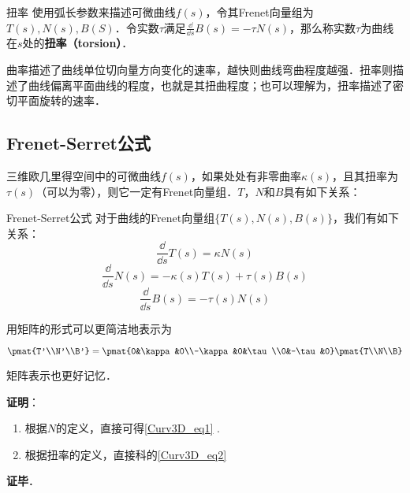 \begin{definition}{扭率}
使用弧长参数来描述可微曲线$f(s)$，令其Frenet向量组为$T(s), N(s), B(S)$．令实数$\tau$满足$\frac{\dd}{\dd s}B(s)=-\tau N(s)$，那么称实数$\tau$为曲线在$s$处的\textbf{扭率（torsion）}．
\end{definition}

曲率描述了曲线单位切向量方向变化的速率，越快则曲线弯曲程度越强．扭率则描述了曲线偏离平面曲线的程度，也就是其扭曲程度；也可以理解为，扭率描述了密切平面旋转的速率．

\subsection{Frenet-Serret公式}

三维欧几里得空间中的可微曲线$f(s)$，如果处处有非零曲率$\kappa(s)$，且其扭率为$\tau(s)$（可以为零），则它一定有Frenet向量组．$T$，$N$和$B$具有如下关系：

\begin{theorem}{Frenet-Serret公式}
对于曲线的Frenet向量组$\{T(s), N(s), B(s)\}$，我们有如下关系：
\begin{equation}\label{Curv3D_eq1}
\frac{\dd}{\dd s}T(s)=\kappa N(s)
\end{equation}
\begin{equation}
\frac{\dd}{\dd s}N(s)=-\kappa(s) T(s)+\tau(s) B(s)
\end{equation}
\begin{equation}\label{Curv3D_eq2}
\frac{\dd}{\dd s}B(s)=-\tau(s) N(s)
\end{equation}

用矩阵的形式可以更简洁地表示为

\begin{equation}
\pmat{T'\\N'\\B'}=\pmat{0&\kappa&0\\-\kappa&0&\tau\\0&-\tau&0}\pmat{T\\N\\B}
\end{equation}

矩阵表示也更好记忆．
\end{theorem}

\textbf{证明}：

\begin{enumerate}
\item 根据$N$的定义，直接可得\autoref{Curv3D_eq1} .
\item 根据扭率的定义，直接科的\autoref{Curv3D_eq2} 
\end{enumerate}

\textbf{证毕}．





